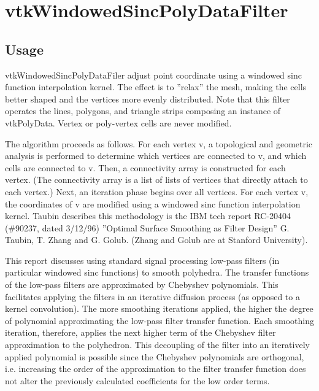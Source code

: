 \section{vtkWindowedSincPolyDataFilter}

\subsection{Usage}

 vtkWindowedSincPolyDataFiler adjust point coordinate using a windowed
 sinc function interpolation kernel.  The effect is to ''relax'' the mesh,
 making the cells better shaped and the vertices more evenly distributed.
 Note that this filter operates the lines, polygons, and triangle strips
 composing an instance of vtkPolyData.  Vertex or poly-vertex cells are
 never modified.

 The algorithm proceeds as follows. For each vertex v, a topological and
 geometric analysis is performed to determine which vertices are connected
 to v, and which cells are connected to v. Then, a connectivity array is
 constructed for each vertex. (The connectivity array is a list of lists
 of vertices that directly attach to each vertex.) Next, an iteration
 phase begins over all vertices. For each vertex v, the coordinates of v
 are modified using a windowed sinc function interpolation kernel.
 Taubin describes this methodology is the IBM tech report RC-20404
 (\#90237, dated 3/12/96) ''Optimal Surface Smoothing as Filter Design''
 G. Taubin, T. Zhang and G. Golub. (Zhang and Golub are at Stanford
 University).

 This report discusses using standard signal processing low-pass filters
 (in particular windowed sinc functions) to smooth polyhedra. The
 transfer functions of the low-pass filters are approximated by
 Chebyshev polynomials. This facilitates applying the filters in an
 iterative diffusion process (as opposed to a kernel convolution).  The
 more smoothing iterations applied, the higher the degree of polynomial
 approximating the low-pass filter transfer function. Each smoothing
 iteration, therefore, applies the next higher term of the Chebyshev
 filter approximation to the polyhedron. This decoupling of the filter
 into an iteratively applied polynomial is possible since the Chebyshev
 polynomials are orthogonal, i.e. increasing the order of the
 approximation to the filter transfer function does not alter the
 previously calculated coefficients for the low order terms. 

